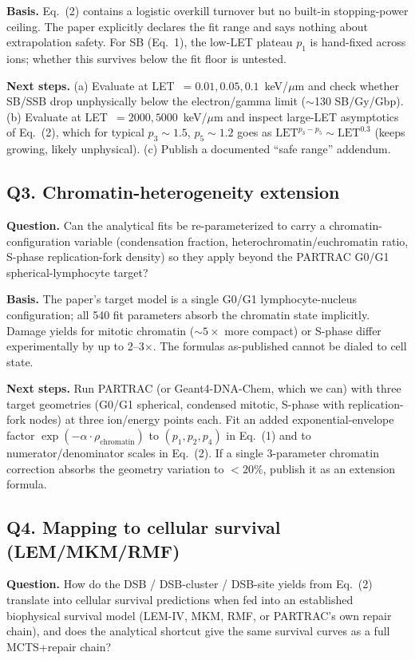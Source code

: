 \textbf{Basis.} Eq.~(2) contains a logistic overkill turnover but no built-in stopping-power ceiling. The paper explicitly declares the fit range and says nothing about extrapolation safety. For SB (Eq.~1), the low-LET plateau $p_1$ is hand-fixed across ions; whether this survives below the fit floor is untested.

\textbf{Next steps.} (a) Evaluate at LET~$=0.01, 0.05, 0.1$~keV/$\mu$m and check whether SB/SSB drop unphysically below the electron/gamma limit ($\sim$130 SB/Gy/Gbp). (b) Evaluate at LET~$=2000, 5000$~keV/$\mu$m and inspect large-LET asymptotics of Eq.~(2), which for typical $p_3\!\sim\!1.5$, $p_5\!\sim\!1.2$ goes as $\mathrm{LET}^{p_3-p_5}\!\sim\!\mathrm{LET}^{0.3}$ (keeps growing, likely unphysical). (c) Publish a documented ``safe range'' addendum.

\subsection*{Q3. Chromatin-heterogeneity extension}
\textbf{Question.} Can the analytical fits be re-parameterized to carry a chromatin-configuration variable (condensation fraction, heterochromatin/euchromatin ratio, S-phase replication-fork density) so they apply beyond the PARTRAC G0/G1 spherical-lymphocyte target?

\textbf{Basis.} The paper's target model is a single G0/G1 lymphocyte-nucleus configuration; all 540 fit parameters absorb the chromatin state implicitly. Damage yields for mitotic chromatin ($\sim 5\times$ more compact) or S-phase differ experimentally by up to 2--3$\times$. The formulas as-published cannot be dialed to cell state.

\textbf{Next steps.} Run PARTRAC (or Geant4-DNA-Chem, which we can) with three target geometries (G0/G1 spherical, condensed mitotic, S-phase with replication-fork nodes) at three ion/energy points each. Fit an added exponential-envelope factor $\exp(-\alpha \cdot \rho_{\text{chromatin}})$ to $(p_1, p_2, p_4)$ in Eq.~(1) and to numerator/denominator scales in Eq.~(2). If a single 3-parameter chromatin correction absorbs the geometry variation to $<20\%$, publish it as an extension formula.

\subsection*{Q4. Mapping to cellular survival (LEM/MKM/RMF)}
\textbf{Question.} How do the DSB / DSB-cluster / DSB-site yields from Eq.~(2) translate into cellular survival predictions when fed into an established biophysical survival model (LEM-IV, MKM, RMF, or PARTRAC's own repair chain), and does the analytical shortcut give the same survival curves as a full MCTS+repair chain?

